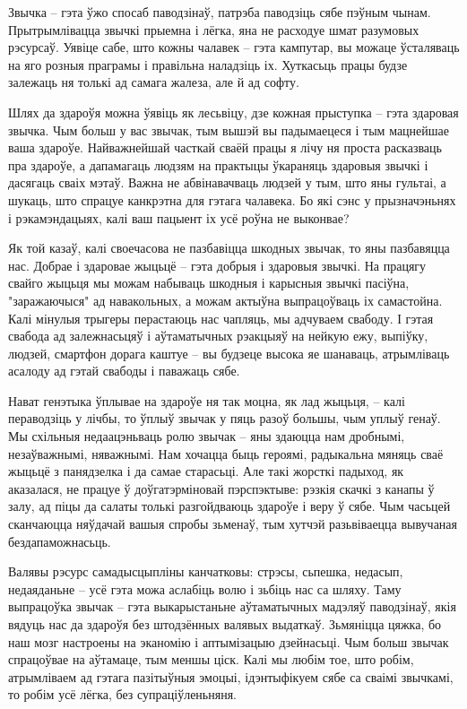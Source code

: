 Звычка – гэта ўжо спосаб паводзінаў, патрэба паводзіць сябе пэўным чынам. Прытрымлівацца звычкі прыемна і лёгка, яна не расходуе шмат разумовых рэсурсаў. Уявіце сабе, што кожны чалавек – гэта кампутар, вы можаце ўсталяваць на яго розныя праграмы і правільна наладзіць іх. Хуткасьць працы будзе залежаць ня толькі ад самага жалеза, але й ад софту.

Шлях да здароўя можна ўявіць як лесьвіцу, дзе кожная прыступка – гэта здаровая звычка. Чым больш у вас звычак, тым вышэй вы падымаецеся і тым мацнейшае ваша здароўе. Найважнейшай часткай сваёй працы я лічу ня проста расказваць пра здароўе, а дапамагаць людзям на практыцы ўкараняць здаровыя звычкі і дасягаць сваіх мэтаў. Важна не абвінавачваць людзей у тым, што яны гультаі, а шукаць, што спрацуе канкрэтна для гэтага чалавека. Бо які сэнс у прызначэньнях і рэкамэндацыях, калі ваш пацыент іх усё роўна не выконвае?

Як той казаў, калі своечасова не пазбавіцца шкодных звычак, то яны пазбавяцца нас. Добрае і здаровае жыцьцё – гэта добрыя і здаровыя звычкі. На працягу свайго жыцьця мы можам набываць шкодныя і карысныя звычкі пасіўна, "заражаючыся" ад навакольных, а можам актыўна выпрацоўваць іх самастойна. Калі мінулыя трыгеры перастаюць нас чапляць, мы адчуваем свабоду. І гэтая свабода ад залежнасьцяў і аўтаматычных рэакцыяў на нейкую ежу, выпіўку, людзей, смартфон дорага каштуе – вы будзеце высока яе шанаваць, атрымліваць асалоду ад гэтай свабоды і паважаць сябе.

Нават генэтыка ўплывае на здароўе ня так моцна, як лад жыцьця, – калі пераводзіць у лічбы, то ўплыў звычак у пяць разоў большы, чым уплыў генаў. Мы схільныя недаацэньваць ролю звычак – яны здаюцца нам дробнымі, незаўважнымі, няважнымі. Нам хочацца быць героямі, радыкальна мяняць сваё жыцьцё з панядзелка і да самае старасьці. Але такі жорсткі падыход, як аказалася, не працуе ў доўгатэрміновай пэрспэктыве: рэзкія скачкі з канапы ў залу, ад піцы да салаты толькі разгойдваюць здароўе і веру ў сябе. Чым часьцей сканчаюцца няўдачай вашыя спробы зьменаў, тым хутчэй разьвіваецца вывучаная бездапаможнасьць.

Валявы рэсурс самадысцыпліны канчатковы: стрэсы, сьпешка, недасып, недаяданьне – усё гэта можа аслабіць волю і зьбіць нас са шляху. Таму выпрацоўка звычак – гэта выкарыстаньне аўтаматычных мадэляў паводзінаў, якія вядуць нас да здароўя без штодзённых валявых выдаткаў. Зьмяніцца цяжка, бо наш мозг настроены на эканомію і аптымізацыю дзейнасьці. Чым больш звычак спрацоўвае на аўтамаце, тым меншы ціск. Калі мы любім тое, што робім, атрымліваем ад гэтага пазітыўныя эмоцыі, ідэнтыфікуем сябе са сваімі звычкамі, то робім усё лёгка, без супраціўленьняня.

